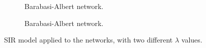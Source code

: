 \begin{figure}
\begin{subfigure}{0.45\textwidth}
            \caption{Barabasi-Albert network.}
            \label{diff_sir_ba_smaller}
        \end{subfigure}
        \begin{subfigure}{0.45\textwidth}
            \caption{Barabasi-Albert network.}
            \label{diff_sir_ba_greater}
        \end{subfigure}
        \caption{SIR model applied to the networks, with two different $\lambda$ values.}
        \label{fig:diff_sir_total}
    \end{figure}

